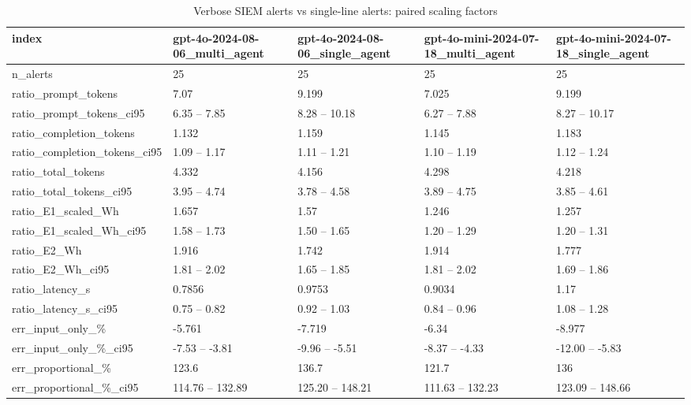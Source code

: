 \begin{table}[!t]
\centering
\caption{Verbose SIEM alerts vs single-line alerts: paired scaling factors}
\label{tab:verbose}
\begin{tabular}{lllll}
\hline
index & gpt-4o-2024-08-06\_multi\_agent & gpt-4o-2024-08-06\_single\_agent & gpt-4o-mini-2024-07-18\_multi\_agent & gpt-4o-mini-2024-07-18\_single\_agent \\
\hline
n\_alerts & 25 & 25 & 25 & 25 \\
ratio\_prompt\_tokens & 7.07 & 9.199 & 7.025 & 9.199 \\
ratio\_prompt\_tokens\_ci95 & 6.35 – 7.85 & 8.28 – 10.18 & 6.27 – 7.88 & 8.27 – 10.17 \\
ratio\_completion\_tokens & 1.132 & 1.159 & 1.145 & 1.183 \\
ratio\_completion\_tokens\_ci95 & 1.09 – 1.17 & 1.11 – 1.21 & 1.10 – 1.19 & 1.12 – 1.24 \\
ratio\_total\_tokens & 4.332 & 4.156 & 4.298 & 4.218 \\
ratio\_total\_tokens\_ci95 & 3.95 – 4.74 & 3.78 – 4.58 & 3.89 – 4.75 & 3.85 – 4.61 \\
ratio\_E1\_scaled\_Wh & 1.657 & 1.57 & 1.246 & 1.257 \\
ratio\_E1\_scaled\_Wh\_ci95 & 1.58 – 1.73 & 1.50 – 1.65 & 1.20 – 1.29 & 1.20 – 1.31 \\
ratio\_E2\_Wh & 1.916 & 1.742 & 1.914 & 1.777 \\
ratio\_E2\_Wh\_ci95 & 1.81 – 2.02 & 1.65 – 1.85 & 1.81 – 2.02 & 1.69 – 1.86 \\
ratio\_latency\_s & 0.7856 & 0.9753 & 0.9034 & 1.17 \\
ratio\_latency\_s\_ci95 & 0.75 – 0.82 & 0.92 – 1.03 & 0.84 – 0.96 & 1.08 – 1.28 \\
err\_input\_only\_\% & -5.761 & -7.719 & -6.34 & -8.977 \\
err\_input\_only\_\%\_ci95 & -7.53 – -3.81 & -9.96 – -5.51 & -8.37 – -4.33 & -12.00 – -5.83 \\
err\_proportional\_\% & 123.6 & 136.7 & 121.7 & 136 \\
err\_proportional\_\%\_ci95 & 114.76 – 132.89 & 125.20 – 148.21 & 111.63 – 132.23 & 123.09 – 148.66 \\
\hline
\end{tabular}
\end{table}

